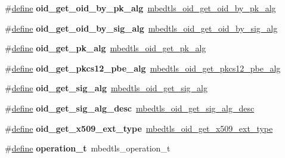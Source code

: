 \begin{DoxyCompactItemize}
\#\hyperlink{structdefine}{define} {\bfseries oid\+\_\+get\+\_\+oid\+\_\+by\+\_\+pk\+\_\+alg}~\hyperlink{oid_8h_af64b657d5ecb14c7035bf5ecf88d4458}{mbedtls\+\_\+oid\+\_\+get\+\_\+oid\+\_\+by\+\_\+pk\+\_\+alg}
\item 
\mbox{\label{compat-1_83_8h_abb5fcf901ef447cf2b5993d689262342}} 
\#\hyperlink{structdefine}{define} {\bfseries oid\+\_\+get\+\_\+oid\+\_\+by\+\_\+sig\+\_\+alg}~\hyperlink{oid_8h_a95b95cb99e0e954313aed008b38fbb2e}{mbedtls\+\_\+oid\+\_\+get\+\_\+oid\+\_\+by\+\_\+sig\+\_\+alg}
\item 
\mbox{\label{compat-1_83_8h_aa73dbfb9d2baa7b442d482a0a1308126}} 
\#\hyperlink{structdefine}{define} {\bfseries oid\+\_\+get\+\_\+pk\+\_\+alg}~\hyperlink{oid_8h_a3bb2578d76ddc458e60c936ef511f9e1}{mbedtls\+\_\+oid\+\_\+get\+\_\+pk\+\_\+alg}
\item 
\mbox{\label{compat-1_83_8h_a536c8b625fae83bf8121f86b590020e1}} 
\#\hyperlink{structdefine}{define} {\bfseries oid\+\_\+get\+\_\+pkcs12\+\_\+pbe\+\_\+alg}~\hyperlink{oid_8h_af7871a692283b368b83f85b37e45f92f}{mbedtls\+\_\+oid\+\_\+get\+\_\+pkcs12\+\_\+pbe\+\_\+alg}
\item 
\mbox{\label{compat-1_83_8h_ace79f15714637eb7767d8655f8aad9d7}} 
\#\hyperlink{structdefine}{define} {\bfseries oid\+\_\+get\+\_\+sig\+\_\+alg}~\hyperlink{oid_8h_abc3e1ab713f5693308de415bbde0d5a0}{mbedtls\+\_\+oid\+\_\+get\+\_\+sig\+\_\+alg}
\item 
\mbox{\label{compat-1_83_8h_af0daecc81e1e458ec9653aa9ef2b5be5}} 
\#\hyperlink{structdefine}{define} {\bfseries oid\+\_\+get\+\_\+sig\+\_\+alg\+\_\+desc}~\hyperlink{oid_8h_ae57f97127e29c749decfb384b3928952}{mbedtls\+\_\+oid\+\_\+get\+\_\+sig\+\_\+alg\+\_\+desc}
\item 
\mbox{\label{compat-1_83_8h_a573b9b3fb9e8b24dadb8a8556d0658d6}} 
\#\hyperlink{structdefine}{define} {\bfseries oid\+\_\+get\+\_\+x509\+\_\+ext\+\_\+type}~\hyperlink{oid_8h_a962c76f60bc09ae7174027f8d4111753}{mbedtls\+\_\+oid\+\_\+get\+\_\+x509\+\_\+ext\+\_\+type}
\item 
\mbox{\label{compat-1_83_8h_a9b1065e39bbaa4d06853b8f297fcb41d}} 
\#\hyperlink{structdefine}{define} {\bfseries operation\+\_\+t}~mbedtls\+\_\+operation\+\_\+t

\end{DoxyCompactItemize}
